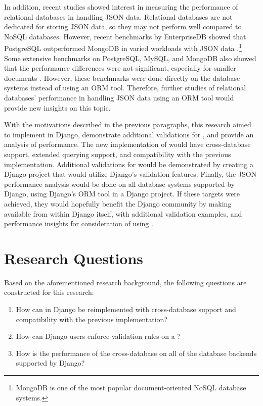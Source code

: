 In addition, recent studies showed interest in measuring the performance of
relational databases in handling JSON data. Relational databases are not
dedicated for storing JSON data, so they may not perform well compared to NoSQL
databases. However, recent benchmarks by EnterpriseDB showed that PostgreSQL
outperformed MongoDB in varied workloads with JSON data
\cite{enterprisedb_benchmark}.\footnote{MongoDB is one of the most popular
document-oriented NoSQL database systems.} Some extensive benchmarks on
PostgreSQL, MySQL, and MongoDB also showed that the performance differences
were not significant, especially for smaller documents \cite{dolgov_benchmark}.
However, these benchmarks were done directly on the database systems instead of
using an ORM tool. Therefore, further studies of relational databases'
performance in handling JSON data using an ORM tool would provide new insights
on this topic.

With the motivations described in the previous paragraphs, this research aimed
to implement  in Django, demonstrate additional validations for
, and provide an analysis of  performance. The
new implementation of  would have cross-database support,
extended querying support, and compatibility with the previous 
implementation. Additional validations for  would be
demonstrated by creating a Django project that would utilize Django's
validation features. Finally, the JSON performance analysis would be done on
all database systems supported by Django, using Django's ORM tool in a Django
project. If these targets were achieved, they would hopefully benefit the
Django community by making  available from within Django
itself, with additional validation examples, and performance insights for
consideration of using .

\section{Research Questions}

Based on the aforementioned research background, the following questions are
constructed for this research:

\begin{enumerate}
    \item How can  in Django be reimplemented with
          cross-database support and compatibility with the previous
           implementation?
    \item How can Django users enforce validation rules on a ?
    \item How is the performance of the cross-database  on all
          of the database backends supported by Django?
\end{enumerate}

